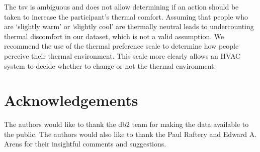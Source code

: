 The \ac{tsv} is ambiguous and does not allow determining if an action should be taken to increase the participant's thermal comfort.
Assuming that people who are `slightly warm' or `slightly cool' are thermally neutral leads to undercounting thermal discomfort in our dataset, which is not a valid assumption.
We recommend the use of the thermal preference scale to determine how people perceive their thermal environment. 
This scale more clearly allows an HVAC system to decide whether to change or not the thermal environment.

\section*{Acknowledgements}\label{sec:acknowledgements}
The authors would like to thank the \acf{db2} team for making the data available to the public.
The authors would also like to thank the Paul Raftery and Edward A. Arens for their insightful comments and suggestions.